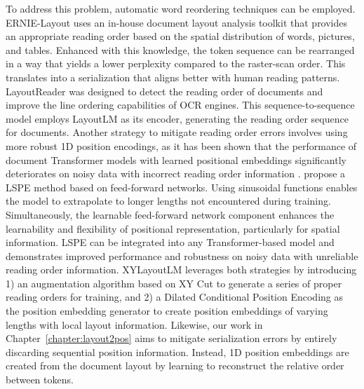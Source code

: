 To address this problem, automatic word reordering techniques can be employed. ERNIE-Layout \citep{peng2022ernie} uses an in-house document layout analysis toolkit that provides an appropriate reading order based on the spatial distribution of words, pictures, and tables. Enhanced with this knowledge, the token sequence can be rearranged in a way that yields a lower perplexity compared to the raster-scan order. This translates into a serialization that aligns better with human reading patterns. LayoutReader \citep{wang2021layoutreader} was designed to detect the reading order of documents and improve the line ordering capabilities of \ac{OCR} engines. This sequence-to-sequence model employs LayoutLM \citep{xu2020layoutlm} as its encoder, generating the reading order sequence for documents. Another strategy to mitigate reading order errors involves using more robust 1D position encodings, as it has been shown that the performance of document Transformer models with learned positional embeddings significantly deteriorates on noisy data with incorrect reading order information \citep{hong2020bros}. \citet{wang2022simple} propose a \ac{LSPE} method based on feed-forward networks. Using sinusoidal functions enables the model to extrapolate to longer lengths not encountered during training. Simultaneously, the learnable feed-forward network component enhances the learnability and flexibility of positional representation, particularly for spatial information. \ac{LSPE} can be integrated into any Transformer-based model and demonstrates improved performance and robustness on noisy data with unreliable reading order information. XYLayoutLM \citep{gu2022xylayoutlm} leverages both strategies by introducing 1) an augmentation algorithm based on XY Cut \citep{ha1995recursive} to generate a series of proper reading orders for training, and 2) a Dilated Conditional Position Encoding as the position embedding generator to create position embeddings of varying lengths with local layout information. Likewise, our work in Chapter~\ref{chapter:layout2pos} aims to mitigate serialization errors by entirely discarding sequential position information. Instead, 1D position embeddings are created from the document layout by learning to reconstruct the relative order between tokens.


